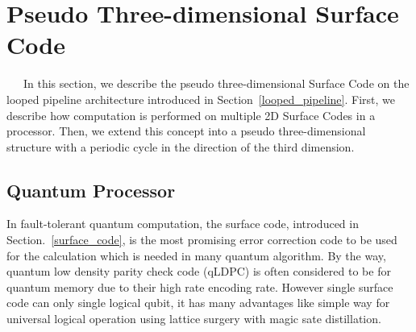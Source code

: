 \documentclass[a4paper,11pt]{ltjsarticle}
\begin{document}
\section{Pseudo Three-dimensional Surface Code}{
    \ \ \ In this section, we describe the pseudo three-dimensional Surface Code on the looped pipeline architecture introduced in Section~\ref{looped_pipeline}. First, we describe how computation is performed on multiple 2D Surface Codes in a processor. Then, we extend this concept into a pseudo three-dimensional structure with a periodic cycle in the direction of the third dimension.

    \subsection{Quantum Processor}{
        In fault-tolerant quantum computation, the surface code, introduced in Section.~\ref{surface_code}, is the most promising error correction code to be used for the calculation which is needed in many quantum algorithm. By the way, quantum low density parity check code (qLDPC) is often considered to be for quantum memory due to their high rate encoding rate. However single surface code can only single logical qubit, it has many advantages like simple way for universal logical operation using lattice surgery with magic sate distillation. 
    }
}
\end{document}
